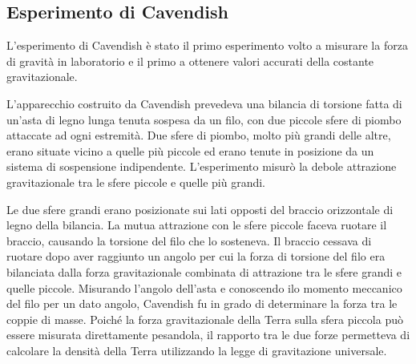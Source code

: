 \subsection{Esperimento di Cavendish}
L'esperimento di Cavendish è stato il primo esperimento volto a misurare la forza di gravità in laboratorio e il primo a ottenere valori accurati della costante gravitazionale.

L'apparecchio costruito da Cavendish prevedeva una bilancia di torsione fatta di un'asta di legno lunga tenuta sospesa da un filo, con due piccole sfere di piombo attaccate ad ogni estremità. Due sfere di piombo, molto più grandi delle altre, erano situate vicino a quelle più piccole ed erano tenute in posizione da un sistema di sospensione indipendente. L'esperimento misurò la debole attrazione gravitazionale tra le sfere piccole e quelle più grandi.

Le due sfere grandi erano posizionate sui lati opposti del braccio orizzontale di legno della bilancia. La mutua attrazione con le sfere piccole faceva ruotare il braccio, causando la torsione del filo che lo sosteneva. Il braccio cessava di ruotare dopo aver raggiunto un angolo per cui la forza di torsione del filo era bilanciata dalla forza gravitazionale combinata di attrazione tra le sfere grandi e quelle piccole. Misurando l'angolo dell'asta e conoscendo ilo momento meccanico del filo per un dato angolo, Cavendish fu in grado di determinare la forza tra le coppie di masse. Poiché la forza gravitazionale della Terra sulla sfera piccola può essere misurata direttamente pesandola, il rapporto tra le due forze permetteva di calcolare la densità della Terra utilizzando la legge di gravitazione universale.

